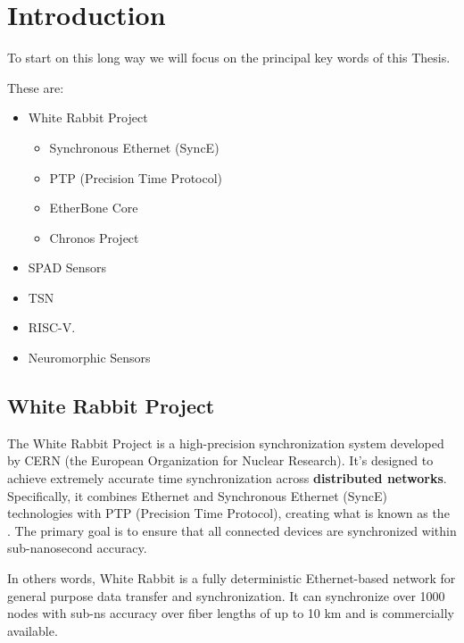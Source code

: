 \section{Introduction}

\label{intro}

To start on this long way we will focus on the principal key words of this Thesis.

\vspace{5 mm}

\noindent These are: 

\begin{itemize}
\item White Rabbit Project
\begin{itemize}
\item Synchronous Ethernet (SyncE) 
\item PTP (Precision Time Protocol) 
\item EtherBone Core
\item Chronos Project
\end{itemize}
\item SPAD Sensors
\item TSN
\item RISC-V.
\item Neuromorphic Sensors
\end{itemize}

\subsection{White Rabbit Project}

The White Rabbit Project \cite{white-rabbit} is a high-precision synchronization system developed by CERN (the European Organization for Nuclear Research).
It’s designed to achieve extremely accurate time synchronization across \textbf{distributed networks}. 
Specifically, it combines Ethernet and Synchronous Ethernet (SyncE) technologies with PTP (Precision Time Protocol), creating what is known as the .
The primary goal is to ensure that all connected devices are synchronized within sub-nanosecond accuracy.

\vspace{5 mm}

\noindent In others words, White Rabbit \cite{WR:ohwr} is a fully deterministic Ethernet-based network for general purpose data transfer and synchronization. 
It can synchronize over 1000 nodes with sub-ns accuracy over fiber lengths of up to 10 km and is commercially available.

